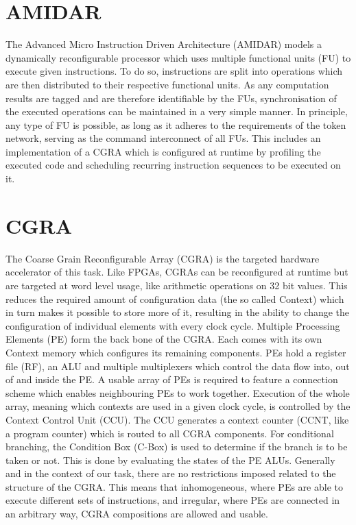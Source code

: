 	\section{AMIDAR} %
	\label{sec:intro_amidar}
		The Advanced Micro Instruction Driven Architecture (AMIDAR) models a dynamically reconfigurable processor which uses multiple functional units (FU) to execute given instructions. 
		To do so, instructions are split into operations which are then distributed to their respective functional units. As any computation results are tagged and are therefore identifiable by the FUs, synchronisation of the executed operations can be maintained in a very simple manner. 
		In principle, any type of FU is possible, as long as it adheres to the requirements of the token network, serving as the command interconnect of all FUs. This includes an implementation of a CGRA which is configured at runtime by profiling the executed code and scheduling recurring instruction sequences to be executed on it.

	\section{CGRA} %
	\label{sec:intro_cgra}
		The Coarse Grain Reconfigurable Array (CGRA) is the targeted hardware accelerator of this task. Like FPGAs, CGRAs can be reconfigured at runtime but are targeted at word level usage, like arithmetic operations on \num{32} bit values. This reduces the required amount of configuration data (the so called Context) which in turn makes it possible to store more of it, resulting in the ability to change the configuration of individual elements with every clock cycle.
		Multiple Processing Elements (PE) form the back bone of the CGRA. Each comes with its own Context memory which configures its remaining components. PEs hold a register file (RF), an ALU and multiple multiplexers which control the data flow into, out of and inside the PE. A usable array of PEs is required to feature a connection scheme which enables neighbouring PEs to work together.
		Execution of the whole array, meaning which contexts are used in a given clock cycle, is controlled by the Context Control Unit (CCU). The CCU generates a context counter (CCNT, like a program counter) which is routed to all CGRA components. For conditional branching, the Condition Box (C-Box) is used to determine if the branch is to be taken or not. This is done by evaluating the states of the PE ALUs.
		Generally and in the context of our task, there are no restrictions imposed related to the structure of the CGRA. This means that inhomogeneous, where PEs are able to execute different sets of instructions, and irregular, where PEs are connected in an arbitrary way, CGRA compositions are allowed and usable.

